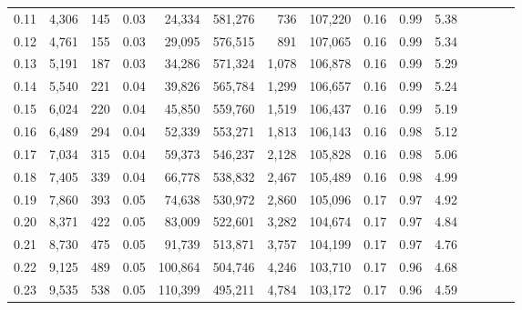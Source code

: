 \begin{tabular}{rrrcrrrrrrrrrrr}
0.11 &   4,306 &    145 &                                       0.03 &   24,334 &  581,276 &      736 &  107,220 &  0.16 &  0.99 &                         5.38 \\
0.12 &   4,761 &    155 &                                       0.03 &   29,095 &  576,515 &      891 &  107,065 &  0.16 &  0.99 &                         5.34 \\
0.13 &   5,191 &    187 &                                       0.03 &   34,286 &  571,324 &    1,078 &  106,878 &  0.16 &  0.99 &                         5.29 \\
0.14 &   5,540 &    221 &                                       0.04 &   39,826 &  565,784 &    1,299 &  106,657 &  0.16 &  0.99 &                         5.24 \\
0.15 &   6,024 &    220 &                                       0.04 &   45,850 &  559,760 &    1,519 &  106,437 &  0.16 &  0.99 &                         5.19 \\
0.16 &   6,489 &    294 &                                       0.04 &   52,339 &  553,271 &    1,813 &  106,143 &  0.16 &  0.98 &                         5.12 \\
0.17 &   7,034 &    315 &                                       0.04 &   59,373 &  546,237 &    2,128 &  105,828 &  0.16 &  0.98 &                         5.06 \\
0.18 &   7,405 &    339 &                                       0.04 &   66,778 &  538,832 &    2,467 &  105,489 &  0.16 &  0.98 &                         4.99 \\
0.19 &   7,860 &    393 &                                       0.05 &   74,638 &  530,972 &    2,860 &  105,096 &  0.17 &  0.97 &                         4.92 \\
0.20 &   8,371 &    422 &                                       0.05 &   83,009 &  522,601 &    3,282 &  104,674 &  0.17 &  0.97 &                         4.84 \\
0.21 &   8,730 &    475 &                                       0.05 &   91,739 &  513,871 &    3,757 &  104,199 &  0.17 &  0.97 &                         4.76 \\
0.22 &   9,125 &    489 &                                       0.05 &  100,864 &  504,746 &    4,246 &  103,710 &  0.17 &  0.96 &                         4.68 \\
0.23 &   9,535 &    538 &                                       0.05 &  110,399 &  495,211 &    4,784 &  103,172 &  0.17 &  0.96 &                         4.59 \\

\end{tabular}

